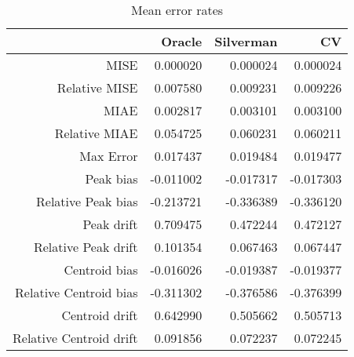 \begin{table}[ht]
\centering
\begin{tabular}{rrrr}
  \hline
 & Oracle & Silverman & CV \\ 
  \hline
MISE & 0.000020 & 0.000024 & 0.000024 \\ 
  Relative MISE & 0.007580 & 0.009231 & 0.009226 \\ 
  MIAE & 0.002817 & 0.003101 & 0.003100 \\ 
  Relative MIAE & 0.054725 & 0.060231 & 0.060211 \\ 
  Max Error & 0.017437 & 0.019484 & 0.019477 \\ 
  Peak bias & -0.011002 & -0.017317 & -0.017303 \\ 
  Relative Peak bias & -0.213721 & -0.336389 & -0.336120 \\ 
  Peak drift & 0.709475 & 0.472244 & 0.472127 \\ 
  Relative Peak drift & 0.101354 & 0.067463 & 0.067447 \\ 
  Centroid bias & -0.016026 & -0.019387 & -0.019377 \\ 
  Relative Centroid bias & -0.311302 & -0.376586 & -0.376399 \\ 
  Centroid drift & 0.642990 & 0.505662 & 0.505713 \\ 
  Relative Centroid drift & 0.091856 & 0.072237 & 0.072245 \\ 
   \hline
\end{tabular}
\caption{Mean error rates} 
\label{tbl:mean_error_rates}
\end{table}
